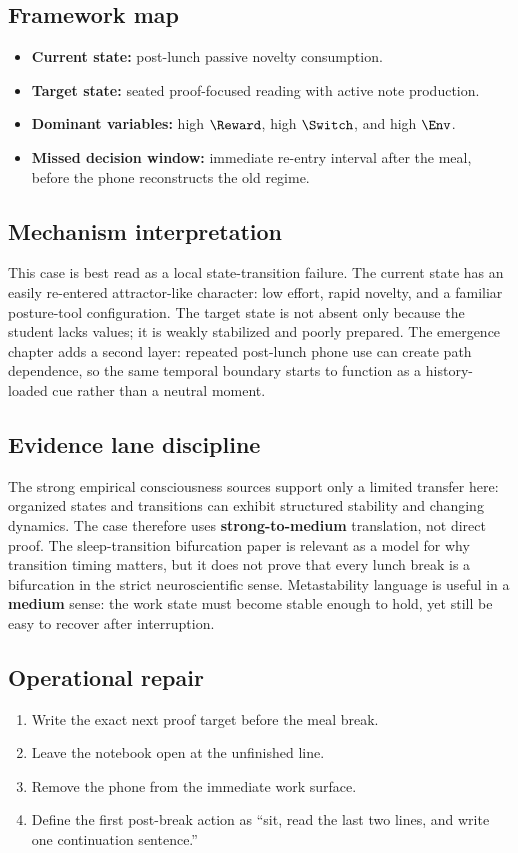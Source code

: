 \subsection*{Framework map}
\begin{itemize}[nosep]
  \item \textbf{Current state:} post-lunch passive novelty consumption.
  \item \textbf{Target state:} seated proof-focused reading with active note
        production.
  \item \textbf{Dominant variables:} high $\Reward$, high $\Switch$, and high
        $\Env$.
  \item \textbf{Missed decision window:} immediate re-entry interval after the
        meal, before the phone reconstructs the old regime.
\end{itemize}

\subsection*{Mechanism interpretation}
This case is best read as a local state-transition failure. The current state
has an easily re-entered attractor-like character: low effort, rapid novelty,
and a familiar posture-tool configuration. The target state is not absent only
because the student lacks values; it is weakly stabilized and poorly prepared.
The emergence chapter adds a second layer: repeated post-lunch phone use can
create path dependence, so the same temporal boundary starts to function as a
history-loaded cue rather than a neutral moment.

\subsection*{Evidence lane discipline}
The strong empirical consciousness sources support only a limited transfer
here: organized states and transitions can exhibit structured stability and
changing dynamics. The case therefore uses \textbf{strong-to-medium}
translation, not direct proof. The sleep-transition bifurcation paper is
relevant as a model for why transition timing matters, but it does not prove
that every lunch break is a bifurcation in the strict neuroscientific sense.
Metastability language is useful in a \textbf{medium} sense: the work state
must become stable enough to hold, yet still be easy to recover after
interruption.

\subsection*{Operational repair}
\begin{enumerate}[nosep]
  \item Write the exact next proof target before the meal break.
  \item Leave the notebook open at the unfinished line.
  \item Remove the phone from the immediate work surface.
  \item Define the first post-break action as ``sit, read the last two lines,
        and write one continuation sentence.''
\end{enumerate}

